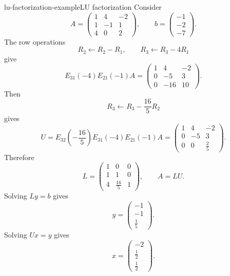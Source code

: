 \documentclass[preview]{standalone}
\begin{document}
\begin{snippetexample}{lu-factorization-example}{LU factorization}
    Consider
    \[
        A=
        \begin{pmatrix}
            1 & 4 & -2\\
            1 & -1 & 1\\
            4 & 0 & 2
        \end{pmatrix},
        \qquad
        b=
        \begin{pmatrix}
            -1\\
            -2\\
            -7
        \end{pmatrix}.
    \]
    The row operations
    \[
        R_2\leftarrow R_2-R_1,
        \qquad
        R_3\leftarrow R_3-4R_1
    \]
    give
    \[
        E_{31}(-4)E_{21}(-1)A
        =
        \begin{pmatrix}
            1 & 4 & -2\\
            0 & -5 & 3\\
            0 & -16 & 10
        \end{pmatrix}.
    \]
    Then
    \[
        R_3\leftarrow R_3-\frac{16}{5}R_2
    \]
    gives
    \[
        U=
        E_{32}\left(-\frac{16}{5}\right)E_{31}(-4)E_{21}(-1)A
        =
        \begin{pmatrix}
            1 & 4 & -2\\
            0 & -5 & 3\\
            0 & 0 & \frac{2}{5}
        \end{pmatrix}.
    \]
    Therefore
    \[
        L=
        \begin{pmatrix}
            1 & 0 & 0\\
            1 & 1 & 0\\
            4 & \frac{16}{5} & 1
        \end{pmatrix},
        \qquad
        A=LU.
    \]
    Solving \(Ly=b\) gives
    \[
        y=
        \begin{pmatrix}
            -1\\
            -1\\
            \frac{1}{5}
        \end{pmatrix}.
    \]
    Solving \(Ux=y\) gives
    \[
        x=
        \begin{pmatrix}
            -2\\
            \frac{1}{2}\\
            \frac{1}{2}
        \end{pmatrix}.
    \]
\end{snippetexample}
\end{document}
